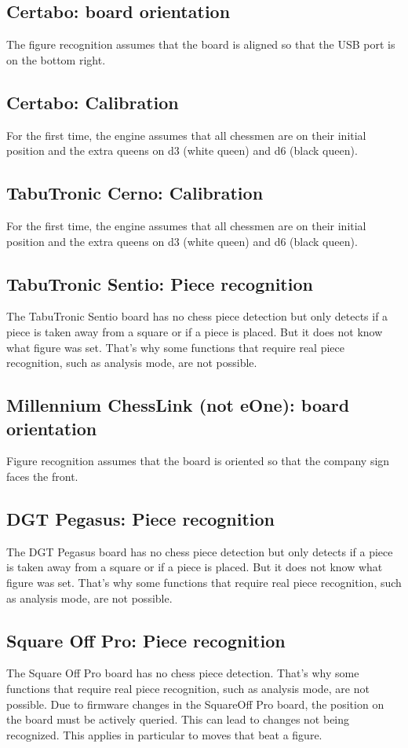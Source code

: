 \documentclass[11pt,a4paper]{article}
\begin{document}
\subsection{Certabo: board orientation}
The figure recognition assumes that the board is aligned so that the USB port is on the bottom right.

\subsection{Certabo: Calibration}
For the first time, the engine assumes that all chessmen are on their initial position and the extra queens on d3 (white queen) and d6 (black queen).

\subsection{TabuTronic Cerno: Calibration}
For the first time, the engine assumes that all chessmen are on their initial position and the extra queens on d3 (white queen) and d6 (black queen).

\subsection{TabuTronic Sentio: Piece recognition}
The TabuTronic Sentio board has no chess piece detection but only detects if a piece is taken away from a square or if a piece is placed. But it does not know what figure was set. That's why some functions that require real piece recognition, such as analysis mode, are not possible.

\subsection{Millennium ChessLink (not eOne): board orientation}
Figure recognition assumes that the board is oriented so that the company sign faces the front.

\subsection{DGT Pegasus: Piece recognition}
The DGT Pegasus board has no chess piece detection but only detects if a piece is taken away from a square or if a piece is placed. But it does not know what figure was set. That's why some functions that require real piece recognition, such as analysis mode, are not possible.

\subsection{Square Off Pro: Piece recognition}
The Square Off Pro board has no chess piece detection. That's why some functions that require real piece recognition, such as analysis mode, are not possible. Due to firmware changes in the SquareOff Pro board, the position on the board must be actively queried. This can lead to changes not being recognized. This applies in particular to moves that beat a figure.
\end{document}
